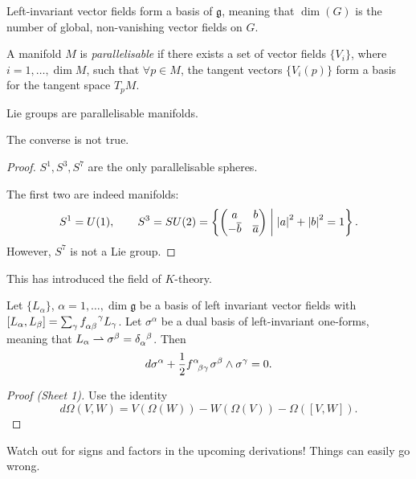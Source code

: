 Left-invariant vector fields form a basis of $\mathfrak{g}$, meaning that $\dim(G)$ is the number of global, non-vanishing vector fields on $G$.
\begin{definition}[parallelisable]
  A manifold $M$  is \emph{parallelisable} if there exists a set of vector fields $\{V_i\}$, where $i = 1, \dots, \dim M$, such that $\forall p \in M$, the tangent vectors $\{V_i(p)\}$ form a basis for the tangent space $T_p M$.
\end{definition}
\begin{claim}
  Lie groups are parallelisable manifolds.
\end{claim}
\begin{claim}
  The converse is not true.
\end{claim}
\begin{proof}
  $S^1, S^3, S^7$  are the only parallelisable spheres.

  The first two are indeed manifolds:
  \begin{equation}
    S^1 = U(1), 
  \qquad S^3 = SU(2) = \left\{ 
    \begin{pmatrix}
     a & b \\
     -\overline{b} & \overline{a} \\
    \end{pmatrix} \suchthat \abs{a}^2 + \abs{b}^2 = 1
  \right\}.
  \end{equation}
  However, $S^7$ is not a Lie group.
\end{proof}
\begin{leftbar}
  This has introduced the field of $K$-theory.
\end{leftbar}

\begin{claim}
  Let $\{L_{\alpha}\}$, $\alpha = 1, \dots, \dim \mathfrak{g}$ be a basis of left invariant vector fields with $ [L_{\alpha}, L_{\beta}] = \sum_\gamma f\indices{_{\alpha\beta}^{\gamma}}L_{\gamma}$.
  Let $\sigma^{\alpha}$ be a dual basis of left-invariant one-forms, meaning that $ L_{\alpha} \rightharpoonup \sigma^{\beta} = \delta\indices{_{\alpha}^{\beta}}$.
  Then
  \begin{equation}
    d\sigma^{\alpha} + \frac{1}{2} f\indices{^{\alpha}_{\beta\gamma}} \sigma^{\beta} \wedge \sigma^{\gamma} = 0 \label{eq:4-star}.
  \end{equation}
\end{claim}
\begin{proof}[Proof (Sheet 1)]
  Use the identity
  \begin{equation}
    d \Omega( V, W) = V(\Omega(W)) - W(\Omega(V)) - \Omega([V, W]).
  \end{equation}
\end{proof}
\begin{leftbar}
  Watch out for signs and factors in the upcoming derivations! Things can easily go wrong.
\end{leftbar}

